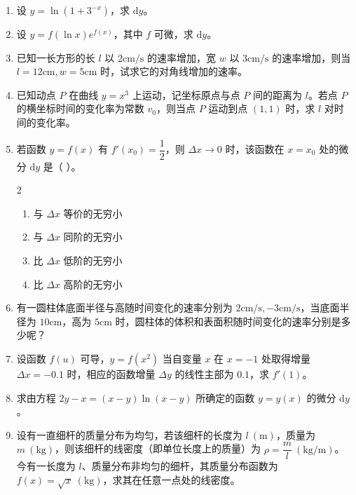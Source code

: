 \begin{enumerate}[label=\textbf{\arabic*.}, itemsep=5cm]
    \item 设 $y = \ln(1 + 3^{-x})$，求 $\mathrm{d} y$。

    \item 设 $y = f(\ln x) e^{f(x)}$，其中 $f$ 可微，求 $\mathrm{d} y$。

    \item 已知一长方形的长 $l$ 以 $2\text{cm/s}$ 的速率增加，宽 $w$ 以 $3\text{cm/s}$ 的速率增加，则当 $l=12\text{cm}, w=5\text{cm}$ 时，试求它的对角线增加的速率。

    \item 已知动点 $P$ 在曲线 $y = x^3$ 上运动，记坐标原点与点 $P$ 间的距离为 $l$。若点 $P$ 的横坐标时间的变化率为常数 $v_0$，则当点 $P$ 运动到点 $(1, 1)$ 时，求 $l$ 对时间的变化率。

    \item 若函数 $y = f(x)$ 有 $f'(x_0) = \dfrac{1}{2}$，则 $\Delta x \to 0$ 时，该函数在 $x=x_0$ 处的微分 $\mathrm{d} y$ 是（ \quad ）。
    \begin{multicols}{2}
        \begin{enumerate}[label=(\Alph*)]
            \item 与 $\Delta x$ 等价的无穷小
            \item 与 $\Delta x$ 同阶的无穷小
            \item 比 $\Delta x$ 低阶的无穷小
            \item 比 $\Delta x$ 高阶的无穷小
        \end{enumerate}
    \end{multicols}

    \item 有一圆柱体底面半径与高随时间变化的速率分别为 $2\text{cm/s}, -3\text{cm/s}$，当底面半径为 $10\text{cm}$，高为 $5\text{cm}$ 时，圆柱体的体积和表面积随时间变化的速率分别是多少呢？

    \item 设函数 $f(u)$ 可导，$y = f(x^2)$ 当自变量 $x$ 在 $x = -1$ 处取得增量 $\Delta x = -0.1$ 时，相应的函数增量 $\Delta y$ 的线性主部为 $0.1$，求 $f'(1)$。

    \item 求由方程 $2y - x = (x - y) \ln(x - y)$ 所确定的函数 $y = y(x)$ 的微分 $\mathrm{d} y$。

    \item 设有一直细杆的质量分布为均匀，若该细杆的长度为 $l \ (\text{m})$，质量为 $m \ (\text{kg})$，则该细杆的线密度（即单位长度上的质量）为 $\rho = \dfrac{m}{l} \ (\text{kg/m})$。今有一长度为 $l$、质量分布非均匀的细杆，其质量分布函数为 $f(x) = \sqrt{x} \ (\text{kg})$，求其在任意一点处的线密度。


\end{enumerate}
